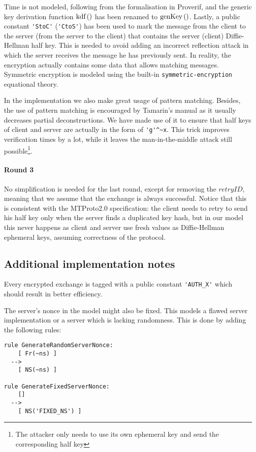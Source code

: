 Time is not modeled, following from the formalisation in Proverif, and the generic key derivation function $\mbox{kdf}\left(\right)$ has been renamed to $\mbox{genKey}\left(\right)$. Lastly, a public constant \lstinline{'StoC'} (\lstinline{'CtoS'}) has been used to mark the message from the client to the server (from the server to the client) that contains the server (client) Diffie-Hellman half key. This is needed to avoid adding an incorrect reflection attack in which the server receives the message he has previously sent. In reality, the encryption actually contains some data that allows matching messages. Symmetric encryption is modeled using the built-in \lstinline{symmetric-encryption} equational theory.

\lstset{language=tamarin}
In the implementation we also make great usage of pattern matching. Besides, the use of pattern matching is encouraged by Tamarin's manual as it usually decreases partial deconstructions. We have made use of it to ensure that half keys of client and server are actually in the form of \lstinline{'g'^~x}. This trick improves verification times by a lot, while it leaves the man-in-the-middle attack still possible\footnote{The attacker only needs to use its own ephemeral key and send the corresponding half key}.

\paragraph{Round 3} No simplification is needed for the last round, except for removing the $retryID$, meaning that we assume that the exchange is always successful. Notice that this is consistent with the MTProto2.0 specification: the client needs to retry to send his half key only when the server finds a duplicated key hash, but in our model this never happens as client and server use fresh values as Diffie-Hellman ephemeral keys, assuming correctness of the protocol.

\subsection{Additional implementation notes}
Every encrypted exchange is tagged with a public constant \lstinline{'AUTH_X'} which should result in better efficiency.

The server's nonce in the model might also be fixed. This models a flawed server implementation or a server which is lacking randomness. This is done by adding the following rules:

\begin{lstlisting}
rule GenerateRandomServerNonce:
    [ Fr(~ns) ]
  -->
    [ NS(~ns) ]

rule GenerateFixedServerNonce:
    []
  -->
    [ NS('FIXED_NS') ]
\end{lstlisting}


